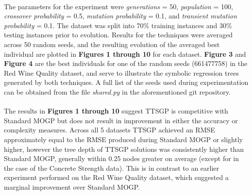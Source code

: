 \documentclass[a4paper]{article}
\begin{document}
\paragraph{}The parameters for the experiment were \textit{generations} = 50, \textit{population} = 100, \textit{crossover probability} = 0.5, \textit{mutation probability} = 0.1, and \textit{transient mutation probability} = 0.1. The dataset was split into 70\% training instances and 30\% testing instances prior to evolution. Results for the techniques were averaged across 50 random seeds, and the resulting evolution of the averaged best individual are plotted in \textbf{Figures 1 through 10} for each dataset. \textbf{Figure 3} and \textbf{Figure 4} are the best individuals for one of the random seeds (661477758) in the Red Wine Quality dataset, and serve to illustrate the symbolic regression trees generated by both techniques. A full list of the seeds used during experimentation can be obtained from the file \textit{shared.py} in the aforementioned git repository. 
\paragraph{} The results in \textbf{Figures 1 through 10} suggest TTSGP is competitive with Standard MOGP but does not result in improvement in either the accuracy or complexity measures. Across all 5 datasets TTSGP achieved an RMSE approximately equal to the RMSE produced during Standard MOGP or slightly higher, however the tree depth of TTSGP solutions was consistently higher than Standard MOGP, generally within 0.25 nodes greater on average (except for in the case of the Concrete Strength data). This is in contrast to an earlier experiment performed on the Red Wine Quality dataset, which suggested a marginal improvement over Standard MOGP.
\end{document}

